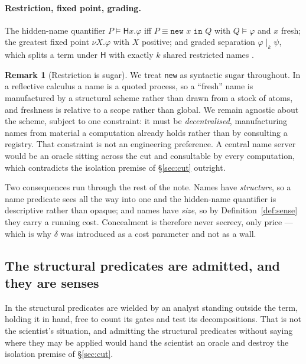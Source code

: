 \documentclass[11pt]{article}
\theoremstyle{plain}
\theoremstyle{definition}
\newtheorem{remark}[theorem]{Remark}
\begin{document}
\paragraph{Restriction, fixed point, grading.} The hidden-name quantifier
$P \models \mathsf{H}x.\varphi$ iff $P \equiv \texttt{new } x \texttt{ in } Q$ with
$Q \models \varphi$ and $x$ fresh; the greatest fixed point $\nu X.\varphi$ with $X$ positive; and
graded separation $\varphi \mid_k \psi$, which splits a term under $\mathsf{H}$ with exactly $k$
shared restricted names \cite[\S2.3]{ClassifierNote}.

\begin{remark}[Restriction is sugar]
\label{rem:sugar}
We treat \texttt{new} as syntactic sugar throughout. In a reflective calculus a name is a quoted
process, so a ``fresh'' name is manufactured by a structural scheme rather than drawn from a stock of
atoms, and freshness is relative to a scope rather than global. We remain agnostic about the scheme,
subject to one constraint: it must be \emph{decentralised}, manufacturing names from material a
computation already holds rather than by consulting a registry. That constraint is not an engineering
preference. A central name server would be an oracle sitting across the cut and consultable by every
computation, which contradicts the isolation premise of \S\ref{sec:cut} outright.

Two consequences run through the rest of the note. Names have \emph{structure}, so a name predicate
sees all the way into one and the hidden-name quantifier is descriptive rather than opaque; and names
have \emph{size}, so by Definition~\ref{def:sense} they carry a running cost. Concealment is therefore
never secrecy, only price --- which is why $\delta$ was introduced as a cost parameter and not as a
wall.
\end{remark}

\subsection{The structural predicates are admitted, and they are senses}

In \cite{ClassifierNote} the structural predicates are wielded by an analyst standing outside the
term, holding it in hand, free to count its gates and test its decompositions. That is not the
scientist's situation, and admitting the structural predicates without saying where they may be
applied would hand the scientist an oracle and destroy the isolation premise of \S\ref{sec:cut}.
\end{document}
